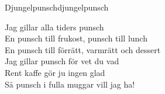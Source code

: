 \begin{song}{Djungelpunsch}{djungelpunsch}
\begin{vers}
Jag gillar alla tiders punsch\\
En punsch till frukost, punsch till lunch\\
En punsch till förrätt, varmrätt och dessert\\
Jag gillar punsch för vet du vad\\
Rent kaffe gör ju ingen glad\\
Så punsch i fulla muggar vill jag ha!\\
\end{vers}
\end{song}
